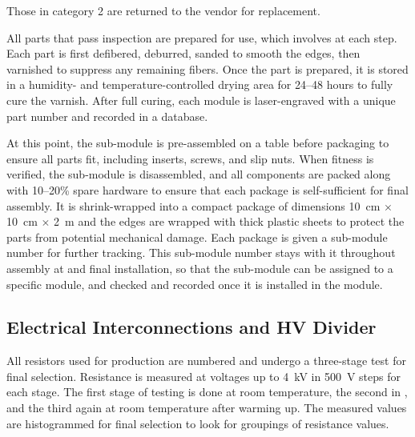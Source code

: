 Those in category 2 are returned to the vendor for replacement.

All  parts that pass inspection are prepared for use, which involves  at each step.  Each part is first defibered, deburred, sanded to smooth the edges, then varnished to
suppress any remaining fibers.  Once the part is prepared, it is stored in a humidity- and temperature-controlled drying area for \numrange{24}{48} hours to fully cure the varnish.  After full curing, each module is laser-engraved with a unique part number and recorded in a   database. 

At this point, the sub-module is pre-assembled on a table before packaging to ensure all parts fit, including inserts, screws, and slip nuts.   When fitness is verified, the sub-module is disassembled, and all components are packed along with  \numrange{10}{20}\% spare hardware to ensure that each package is self-sufficient for final assembly. It is shrink-wrapped into a compact package of dimensions \SI{10}{\cm} $\times$ \SI{10}{\cm} $\times$ \SI{2}{\m}  and the edges are wrapped with thick plastic sheets to protect the parts from %
potential mechanical damage. %
Each package is given a sub-module number for further tracking.  This sub-module number stays with it throughout assembly at  and final installation, so that the sub-module can be assigned to a specific module, and checked and recorded once it is installed in the module. 

\subsection{Electrical Interconnections and HV Divider}
\label{sec:fddp-hv-prod-interconnect}

All resistors used for  production are numbered and undergo a three-stage %
 test for final selection. Resistance is measured at voltages up to \SI{4}{kV} in \SI{500}{V} steps for each stage. The first stage of testing is done at room temperature, the second in \lntwo, and the third again at room temperature after warming up.  The measured values are histogrammed for final selection to look for groupings of resistance values.   

